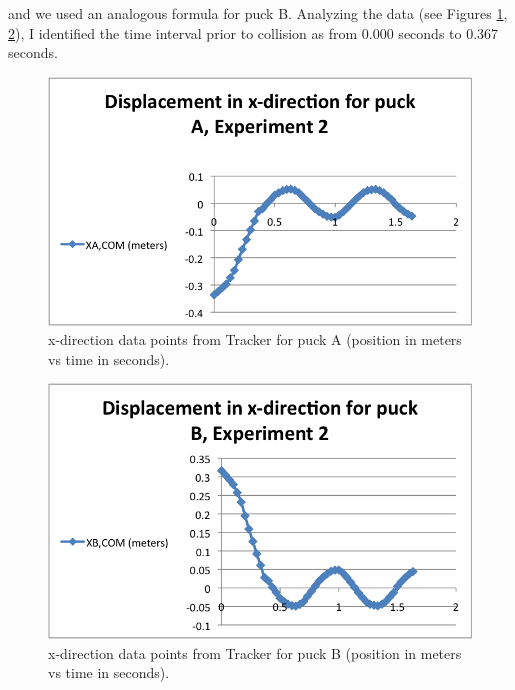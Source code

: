 \documentclass[11pt]{article}
\begin{document}
and we used an analogous formula for puck B. Analyzing the data (see Figures \ref{xA2}, \ref{xB2}), I identified the time interval prior to collision as from 0.000 seconds to 0.367 seconds. 


\begin{figure}[!h]
     \includegraphics{x_A2.png}
     \caption{x-direction data points from Tracker for puck A (position in meters vs time in seconds).}
     \label{xA2}
\end{figure}

\begin{figure}[!h]
     \includegraphics{x_B2.png}
     \caption{x-direction data points from Tracker for puck B (position in meters vs time in seconds).}
     \label{xB2}
\end{figure}
\end{document}
